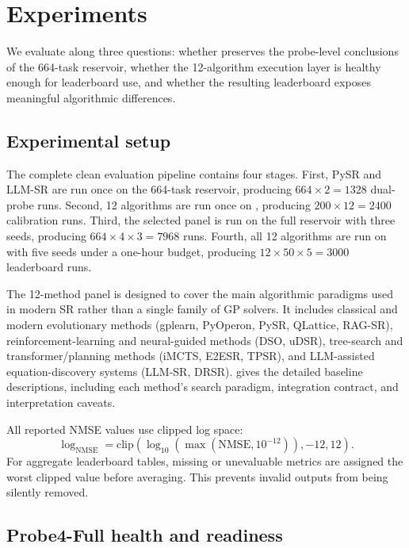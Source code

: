 \section{Experiments}

We evaluate \arena{} along three questions: whether \core{} preserves the probe-level conclusions of the 664-task reservoir, whether the 12-algorithm execution layer is healthy enough for leaderboard use, and whether the resulting leaderboard exposes meaningful algorithmic differences.

\subsection{Experimental setup}

The complete clean evaluation pipeline contains four stages. First, PySR and LLM-SR are run once on the 664-task reservoir, producing $664\times2=1328$ dual-probe runs. Second, 12 algorithms are run once on \candidate{}, producing $200\times12=2400$ calibration runs. Third, the selected \probe{} panel is run on the full reservoir with three seeds, producing $664\times4\times3=7968$ runs. Fourth, all 12 algorithms are run on \core{} with five seeds under a one-hour budget, producing $12\times50\times5=3000$ leaderboard runs.

The 12-method panel is designed to cover the main algorithmic paradigms used in modern SR rather than a single family of GP solvers. It includes classical and modern evolutionary methods (gplearn, PyOperon, PySR, QLattice, RAG-SR), reinforcement-learning and neural-guided methods (DSO, uDSR), tree-search and transformer/planning methods (iMCTS, E2ESR, TPSR), and LLM-assisted equation-discovery systems (LLM-SR, DRSR).  gives the detailed baseline descriptions, including each method's search paradigm, integration contract, and interpretation caveats.

All reported NMSE values use clipped log space:
\[
\log_\mathrm{NMSE}=\mathrm{clip}(\log_{10}(\max(\mathrm{NMSE},10^{-12})),-12,12).
\]
For aggregate leaderboard tables, missing or unevaluable metrics are assigned the worst clipped value before averaging. This prevents invalid outputs from being silently removed.

\subsection{Probe4-Full health and readiness}


